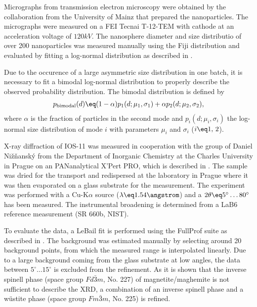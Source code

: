 \documentclass[\main/dresen_thesis.tex]{subfiles}
\begin{document}
  \label{sec:looselyPackedNS:characterization:nanoparticles}
    Micrographs from transmission electron microscopy were obtained by the collaboration from the University of Mainz that prepared the nanoparticles.
    The micrographs were measured on a FEI Tecnai T-12-TEM with  cathode at an acceleration voltage of $120 \unit{kV}$.
    The nanosphere diameter and size distributio of over 200 nanoparticles was measured manually using the Fiji distribution \cite{Schindelin_2012_Fijia} and evaluated by fitting a log-normal distribution as described in .

    Due to the occurence of a large asymmetric size distribution in one batch, it is necessary to fit a bimodal log-normal distribution to properly describe the observed probability distribution.
    The bimodal distribution is defined by
    \begin{align}
      p_\mathrm{bimodal}(d) \eq (1 - \alpha) p_1(d; \mu_1, \sigma_1) + \alpha p_2(d; \mu_2, \sigma_2),
    \end{align}
    where $\alpha$ is the fraction of particles in the second mode and $p_i(d; \mu_i, \sigma_i)$ the log-normal size distribution of mode $i$ with parameters $\mu_i$ and $\sigma_i$ ($i \eq 1,\,2$).

    X-ray diffraction of IOS-11 was measured in cooperation with the group of Daniel Nižňanský from the Department of Inorganic Chemistry at the Charles University in Prague on an PANanalytical X'Pert PRO, which is described in .
    The sample was dried for the transport and redispersed at the laboratory in Prague where it was then evaporated on a glass substrate for the measurement.
    The experiment was performed with a Cu-K$\alpha$ source ($\lambda \eq 1.54 \angstrom$) and a $2 \theta \eq 5^\circ \ldots 80^\circ$ has been measured.
    The instrumental broadening is determined from a LaB6 reference measurement (SR 660b, NIST).

    To evaluate the data, a LeBail fit is performed using the FullProf suite \cite{Rodriguez_1993_Recen} as described in .
    The background was estimated manually by selecting around 20 background points, from which the measured range is interpolated linearly.
    Due to a large background coming from the glass substrate at low angles, the data between $5 ^\circ \ldots 15 ^\circ$ is excluded from the refinement.
    As it is shown that the inverse spinell phase (space group $Fd\bar{3}m$, No. 227) of magnetite/maghemite is not sufficient to describe the XRD, a combination of an inverse spinell phase and a w\"ustite phase (space group $Fm\bar{3}m$, No. 225) is refined.
\end{document}
